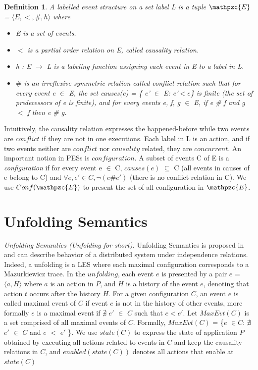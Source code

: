 \documentclass[a4paper,11pt]{article}
\theoremstyle{break}
\newtheorem{definition}{Definition}
\begin{document}
\begin{definition} A labelled event structure on a set label L is a tuple  $\mathpzc{E}$ = $\langle E,<,\#,h \rangle$ where
 \begin{itemize}[noitemsep]
 	\setlength{\itemsep}{2pt}
\item E is a set of events.
\item $<$ is a partial order relation on E, called causality relation.
\item h : E $\rightarrow$ L is a labeling function assigning each event in E to a label in L. 
\item  $\#$ is an irreflexive symmetric relation called conflict relation such that for every event e $\in$ E, the set causes(e) = \{ e' $\in$ E: e'$<e$\} is finite (the set of predecessors of e is finite), and for every events e, f, g $\in$ E, if e \# f and g $<$ f then e \# g.
\end{itemize}
\end{definition}
 Intuitively, the causality relation expresses the happened-before while two events are $conflict$ if they are not in one executions. Each label in L is an action, and if two events neither are $conflict$ nor $causality$ related, they are $concurrent$. An important notion in PESs is $configuration$. A subset of events C of E is a \textit{configuration} if for every event e $\in$ C, $causes(e)$ $\subseteq$ C (all events in causes of e belong to C) and $\forall e, e' \in C, \neg(e \# e')$ (there is no conflict relation in C). We use $Conf(\mathpzc{E})$ to present the set of all configuration in $\mathpzc{E}$.
 
 \section{Unfolding Semantics}

 \textit{Unfolding Semantics (Unfolding for short).} Unfolding Semantics is proposed in~\cite{DBLP:journals/corr/abs-1802-03950} and can describe behavior of a distributed system under independence relations. Indeed, a unfolding is a LES where each maximal configuration corresponds to a Mazurkiewicz trace. In the $unfolding$, each event $e$ is presented by a pair $e$ = $\langle a, H \rangle$ where $a$ is an action in $P$, and $H$ is a history of the event $e$, denoting that action $t$ occurs after the history $H$. For a given configuration $C$, an event $e$ is called maximal event of $C$ if event $e$ is not in the history of other events, more formally $e$ is a maximal event if $\nexists$ $e'$ $\in$ $C$ such that $e < e'$. Let $MaxEvt(C)$ is a set comprised of all maximal events of $C$. Formally, $MaxEvt(C)$ = \{$e$ $\in C $: $\nexists$ $e'$ $\in$ $C$ and $e$ $<$ $e'$ \}. We use $state(C)$ to express the state of application $P$ obtained by executing all actions related to events in $C$ and keep the causality relations in $C$, and $enabled(state(C))$ denotes all actions that enable at $state(C)$
 
\end{document}
